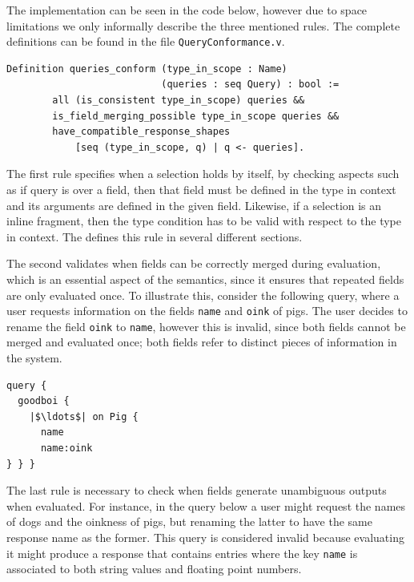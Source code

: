 The implementation can be seen in the code below, however due to space limitations we only informally describe the three mentioned rules. The complete definitions can be found in the file \texttt{QueryConformance.v}.

\begin{verbatim}
Definition queries_conform (type_in_scope : Name)
                           (queries : seq Query) : bool :=
        all (is_consistent type_in_scope) queries &&
        is_field_merging_possible type_in_scope queries &&
        have_compatible_response_shapes
            [seq (type_in_scope, q) | q <- queries].
\end{verbatim}



The first rule specifies when a selection holds by itself, by checking aspects such as if query is over a field, then that field must be defined in the  type in context and its arguments are defined in the given field. Likewise, if a selection is an inline fragment, then the type condition has to be valid with respect to the type in context. The \spec{} defines this rule in several different sections.

The second validates when fields can be correctly merged during evaluation, which is an essential aspect of the semantics, since it ensures that repeated fields are only evaluated once. To illustrate this, consider the following query, where a user requests information on the fields \texttt{name} and \texttt{oink} of pigs. The user decides to rename the field \texttt{oink} to \texttt{name}, however this is invalid, since both fields cannot be merged and evaluated once; both fields refer to distinct pieces of information in the system.

\begin{verbatim}
query {
  goodboi {
    |$\ldots$| on Pig {
	  name
	  name:oink
} } }
\end{verbatim}

The last rule is necessary to check when fields generate unambiguous outputs when evaluated. For instance, in the query below a user might request the names of dogs and the oinkness of pigs, but renaming the latter to have the same response name as the former. This query is considered invalid because evaluating it might produce a response that contains entries where the key \texttt{name} is associated to both string values and floating point numbers. 

